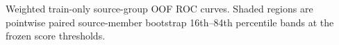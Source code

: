 Weighted train-only source-group OOF ROC curves. Shaded regions are pointwise paired source-member bootstrap 16th--84th percentile bands at the frozen score thresholds.
